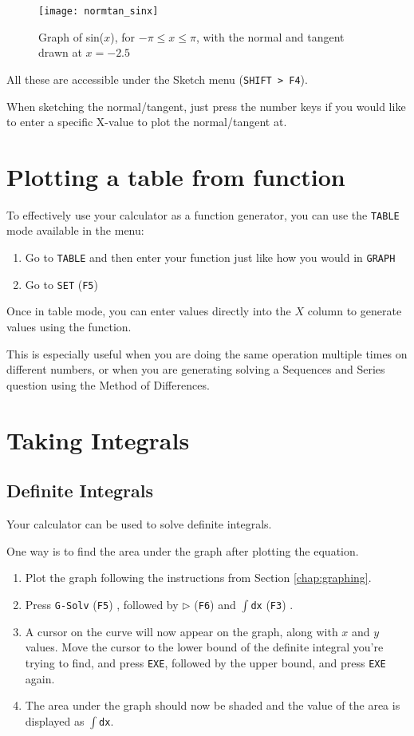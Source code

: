 \documentclass[a5paper]{memoir}
\def\code#1{\texttt{#1}}
\def\Fthree{(\code{F3}) }
\def\Ffive{(\code{F5}) }
\def\Fsix{(\code{F6}) }
\begin{document}
\begin{figure}[h]
	\centering
	\texttt{[image: normtan\_sinx]}
	\caption{Graph of sin($x$), for $-\pi \leq x \leq \pi$, with the normal and tangent drawn at $x=-2.5$}
\end{figure}

All these are accessible under the Sketch menu (\code{SHIFT > F4}).

When sketching the normal/tangent, just press the number keys if you would like to enter a specific X-value to plot the normal/tangent at.

\section{Plotting a table from function} \label{sec:plottable}
To effectively use your calculator as a function generator, you can use the \code{TABLE} mode available in the menu:
\begin{enumerate}
	\item Go to \code{TABLE} and then enter your function just like how you would in \code{GRAPH}
	\item Go to \code{SET} \Ffive
\end{enumerate}

Once in table mode, you can enter values directly into the $X$ column to generate values using the function. 

This is especially useful when you are doing the same operation multiple times on different numbers, or when you are generating solving a Sequences and Series question using the Method of Differences.

\section{Taking Integrals}
\subsection{Definite Integrals}
Your calculator can be used to solve definite integrals.

One way is to find the area under the graph after plotting the equation.

\begin{enumerate}
	\item Plot the graph following the instructions from Section \ref{chap:graphing}.
	\item Press \code{G-Solv} \Ffive, followed by $\triangleright$ \Fsix and \code{$\int$dx} \Fthree.
	\item A cursor on the curve will now appear on the graph, along with $x$ and $y$ values. Move the cursor to the lower bound of the definite integral you're trying to find, and press \code{EXE}, followed by the upper bound, and press \code{EXE} again.
	\item The area under the graph should now be shaded and the value of the area is displayed as \code{$\int$dx}.
\end{enumerate}
\end{document}
